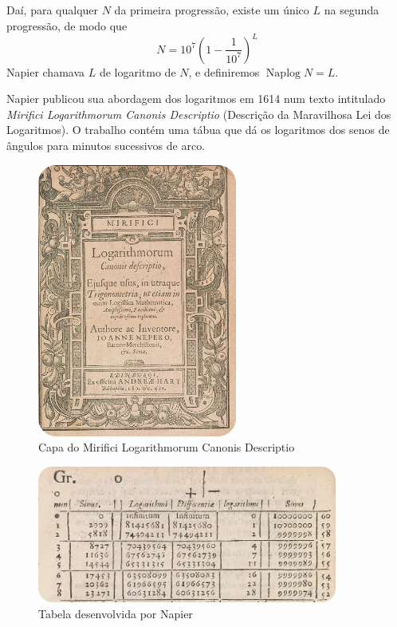 Daí, para qualquer $N$ da primeira progressão, existe um único $L$ na segunda progressão, de modo que
$$
N = 10^7 \left(1 - \frac{1}{10^7}\right)^L
$$
Napier chamava $L$ de logaritmo de $N$, e definiremos $\operatorname{Naplog} N = L$.

Napier publicou sua abordagem dos logaritmos em 1614 num texto intitulado \textit{Mirifici Logarithmorum Canonis Descriptio} (Descrição da Maravilhosa Lei dos Logaritmos). O trabalho contém uma tábua que dá os logaritmos dos senos de ângulos para minutos sucessivos de arco.

\begin{figure}[H]
    \centering
    \includegraphics[height=9cm]{img/mirificiLog.png}
    \caption{Capa do Mirifici Logarithmorum Canonis Descriptio}
\end{figure}

\begin{figure}[H]
    \centering
    \includegraphics[height=4.5cm]{img/tabelanapier.png}
    \caption{Tabela desenvolvida por Napier}
\end{figure}